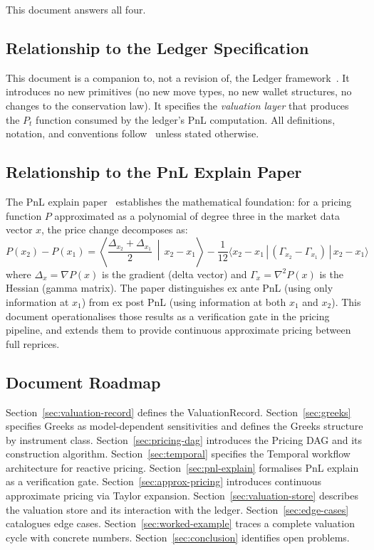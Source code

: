 \documentclass[11pt,a4paper]{article}
\begin{document}
This document answers all four.

\subsection{Relationship to the Ledger Specification}

This document is a companion to, not a revision of, the Ledger framework~\cite{ledger}.  It introduces no new primitives (no new move types, no new wallet structures, no changes to the conservation law).  It specifies the \emph{valuation layer} that produces the $P_t$ function consumed by the ledger's PnL computation.  All definitions, notation, and conventions follow~\cite{ledger} unless stated otherwise.

\subsection{Relationship to the PnL Explain Paper}

The PnL explain paper~\cite{pnl_explain} establishes the mathematical foundation: for a pricing function $P$ approximated as a polynomial of degree three in the market data vector $x$, the price change decomposes as:
\[
P(x_2) - P(x_1) = \left\langle \frac{\Delta_{x_2} + \Delta_{x_1}}{2} \,\middle|\, x_2 - x_1 \right\rangle - \frac{1}{12}\langle x_2 - x_1 \,|\, (\Gamma_{x_2} - \Gamma_{x_1}) \,|\, x_2 - x_1 \rangle
\]
where $\Delta_x = \nabla P(x)$ is the gradient (delta vector) and $\Gamma_x = \nabla^2 P(x)$ is the Hessian (gamma matrix).  The paper distinguishes ex ante PnL (using only information at $x_1$) from ex post PnL (using information at both $x_1$ and $x_2$).  This document operationalises those results as a verification gate in the pricing pipeline, and extends them to provide continuous approximate pricing between full reprices.

\subsection{Document Roadmap}

Section~\ref{sec:valuation-record} defines the ValuationRecord.  Section~\ref{sec:greeks} specifies Greeks as model-dependent sensitivities and defines the Greeks structure by instrument class.  Section~\ref{sec:pricing-dag} introduces the Pricing DAG and its construction algorithm.  Section~\ref{sec:temporal} specifies the Temporal workflow architecture for reactive pricing.  Section~\ref{sec:pnl-explain} formalises PnL explain as a verification gate.  Section~\ref{sec:approx-pricing} introduces continuous approximate pricing via Taylor expansion.  Section~\ref{sec:valuation-store} describes the valuation store and its interaction with the ledger.  Section~\ref{sec:edge-cases} catalogues edge cases.  Section~\ref{sec:worked-example} traces a complete valuation cycle with concrete numbers.  Section~\ref{sec:conclusion} identifies open problems.
\end{document}

